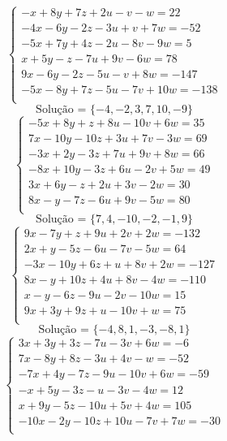 \documentclass[12pt,oneside,a4paper]{article}
\begin{document}
\vspace{\baselineskip}
\begin{equation*}
\begin{cases}
-x+8y+7z+2u-v-w=22 \\
-4x-6y-2z-3u+v+7w=-52 \\
-5x+7y+4z-2u-8v-9w=5 \\
x+5y-z-7u+9v-6w=78 \\
9x-6y-2z-5u-v+8w=-147 \\
-5x-8y+7z-5u-7v+10w=-138 \\
\end{cases}
\end{equation*}
\begin{equation*}
\text{Solução = }\{-4,-2,3,7,10,-9\}
\end{equation*}
\vspace{\baselineskip}
\begin{equation*}
\begin{cases}
-5x+8y+z+8u-10v+6w=35 \\
7x-10y-10z+3u+7v-3w=69 \\
-3x+2y-3z+7u+9v+8w=66 \\
-8x+10y-3z+6u-2v+5w=49 \\
3x+6y-z+2u+3v-2w=30 \\
8x-y-7z-6u+9v-5w=80 \\
\end{cases}
\end{equation*}
\begin{equation*}
\text{Solução = }\{7,4,-10,-2,-1,9\}
\end{equation*}
\vspace{\baselineskip}
\begin{equation*}
\begin{cases}
9x-7y+z+9u+2v+2w=-132 \\
2x+y-5z-6u-7v-5w=64 \\
-3x-10y+6z+u+8v+2w=-127 \\
8x-y+10z+4u+8v-4w=-110 \\
x-y-6z-9u-2v-10w=15 \\
9x+3y+9z+u-10v+w=75 \\
\end{cases}
\end{equation*}
\begin{equation*}
\text{Solução = }\{-4,8,1,-3,-8,1\}
\end{equation*}
\vspace{\baselineskip}
\begin{equation*}
\begin{cases}
3x+3y+3z-7u-3v+6w=-6 \\
7x-8y+8z-3u+4v-w=-52 \\
-7x+4y-7z-9u-10v+6w=-59 \\
-x+5y-3z-u-3v-4w=12 \\
x+9y-5z-10u+5v+4w=105 \\
-10x-2y-10z+10u-7v+7w=-30 \\
\end{cases}
\end{equation*}
\end{document}
